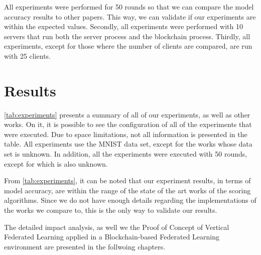 All experiments were performed for 50 rounds so that we can compare the model accuracy results to other papers. This way, we can validate if our experiments are within the expected values. Secondly, all experiments were performed with 10 servers that run both the server process and the blockchain process. Thirdly, all experiments, except for those where the number of clients are compared, are run with 25 clients.

\section{Results}

\autoref{tab:experiments} presents a summary of all of our experiments, as well as other works. On it, it is possible to see the configuration of all of the experiments that were executed. Due to space limitations, not all information is presented in the table. All experiments use the MNIST data set, except for the works \cite{10.48550/arxiv.2007.03856, 10.48550/arxiv.2011.07516} whose data set is unknown. In addition, all the experiments were executed with 50 rounds, except for \cite{9170559} which is also unknown.

From \autoref{tab:experiments}, it can be noted that our experiment results, in terms of model accuracy, are within the range of the state of the art works of the scoring algorithms. Since we do not have enough details regarding the implementations of the works we compare to, this is the only way to validate our results.

The detailed impact analysis, as well we the Proof of Concept of Vertical Federated Learning applied in a Blockchain-based Federated Learning environment are presented in the follwoing chapters.

